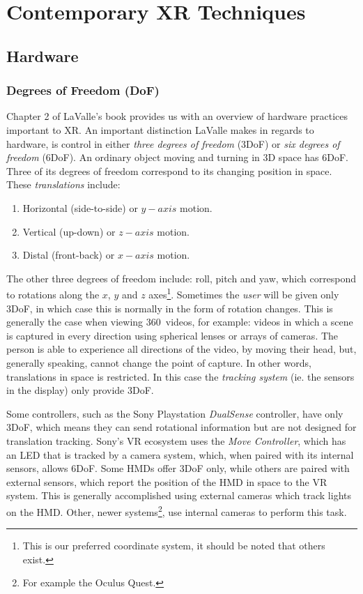 \section{Contemporary XR Techniques}

\subsection{Hardware} \label{subsec:hardware}

\subsubsection{Degrees of Freedom (DoF)}

Chapter 2 of LaValle's book \cite{lavalle2016virtual} provides us with an overview of hardware practices important to XR. An important distinction LaValle makes in regards to hardware, is control in either \textit{three degrees of freedom} (3DoF) or \textit{six degrees of freedom} (6DoF). An ordinary object moving and turning in 3D space has 6DoF. Three of its degrees of freedom correspond to its changing position in space. These \textit{translations} include: 

\begin{enumerate}
    \item Horizontal (side-to-side) or $y-axis$ motion.
    \item Vertical (up-down) or $z-axis$ motion.
    \item Distal (front-back) or $x-axis$ motion.
\end{enumerate}

The other three degrees of freedom include: roll, pitch and yaw, which correspond to rotations along the $x$, $y$ and $z$ axes\footnote{This is our preferred coordinate system, it should be noted that others exist.}. Sometimes the \textit{user} will be given only 3DoF, in which case this is normally in the form of rotation changes. This is generally the case when viewing 360\textdegree \ videos, for example: videos in which a scene is captured in every direction using spherical lenses or arrays of cameras. The person is able to experience all directions of the video, by moving their head, but, generally speaking, cannot change the point of capture. In other words, translations in space is restricted. In this case the \textit{tracking system} (ie. the sensors in the display) only provide 3DoF.

Some controllers, such as the Sony Playstation \textit{DualSense} controller, have only 3DoF, which means they can send rotational information but are not designed for translation tracking. Sony's VR ecosystem uses the \textit{Move Controller}, which has an LED that is tracked by a camera system, which, when paired with its internal sensors, allows 6DoF. Some HMDs offer 3DoF only, while others are paired with external sensors, which report the position of the HMD in space to the VR system. This is generally accomplished using external cameras which track lights on the HMD. Other, newer systems\footnote{For example the Oculus Quest.}, use internal cameras to perform this task. 

